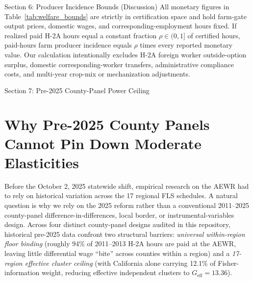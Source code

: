 \begin{llmdraft}{Section 6: Producer Incidence Bounds (Discussion)}
All monetary figures in Table~\ref{tab:welfare_bounds} are strictly in
certification space and hold farm-gate output prices, domestic wages, and
corresponding-employment hours fixed. If realized paid H-2A hours equal a
constant fraction $\rho \in (0, 1]$ of certified hours, paid-hours farm
producer incidence equals $\rho$ times every reported monetary value. Our
calculation intentionally excludes H-2A foreign worker outside-option surplus,
domestic corresponding-worker transfers, administrative compliance costs, and
multi-year crop-mix or mechanization adjustments.
\end{llmdraft}

\FloatBarrier
\begin{llmdraft}{Section 7: Pre-2025 County-Panel Power Ceiling}
\section{Why Pre-2025 County Panels Cannot Pin Down Moderate Elasticities}
\label{sec:pre2025_power}

Before the October 2, 2025 statewide shift, empirical research on the AEWR had
to rely on historical variation across the 17 regional FLS schedules. A natural
question is why we rely on the 2025 reform rather than a conventional
2011--2025 county-panel difference-in-differences, local border, or
instrumental-variables design. Across four distinct county-panel designs
audited in this repository, historical pre-2025 data confront two structural
barriers: \emph{universal within-region floor binding} (roughly 94\% of
2011--2013 H-2A hours are paid at the AEWR, leaving little differential wage
``bite'' across counties within a region) and a \emph{17-region effective
cluster ceiling} (with California alone carrying 12.1\% of Fisher-information
weight, reducing effective independent clusters to $G_{\text{eff}} = 13.36$).


\end{llmdraft}
